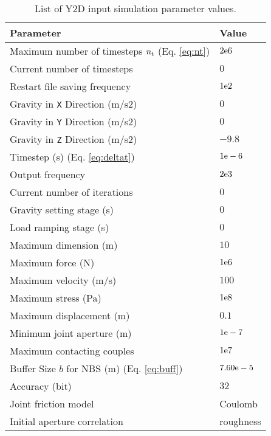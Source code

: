 \documentclass[format=acmtog,12pt,screen=true,review=false,natbib=false,]{acmart}
\begin{document}
\begin{table}[t]
  \caption{List of Y2D input simulation parameter values.}
  \begin{tabularx}{\columnwidth}{ll}
    Parameter                               & Value                     \\\midrule
    Maximum number of timesteps $n_{\rm{t}}$ (Eq. \ref{eq:nt})& $2{\rm{e}}6$         \\
    Current number of timesteps             & $0$                       \\
    Restart file saving frequency           & $1{\rm{e}}2$              \\
    Gravity in \texttt{X} Direction (m/s2)  & $0$                       \\
    Gravity in \texttt{Y} Direction (m/s2)  & $0$                       \\
    Gravity in \texttt{Z} Direction (m/s2)  & $-9.8$                    \\
    Timestep (s) (Eq. \ref{eq:deltat})      & $1{\rm{e}}-6$             \\
    Output frequency                        & $2{\rm{e}}3$              \\
    Current number of iterations            & $0$                       \\
    Gravity setting stage (s)               & $0$                       \\
    Load ramping stage (s)                  & $0$                       \\
    Maximum dimension (m)                   & $10$                      \\
    Maximum force (N)                       & $1{\rm{e}}6$              \\
    Maximum velocity (m/s)                  & $100$                     \\
    Maximum stress (Pa)                     & $1{\rm{e}}8$              \\
    Maximum displacement (m)                & $0.1$                     \\
    Minimum joint aperture (m)              & $1{\rm{e}}-7$             \\
    Maximum contacting couples              & $1{\rm{e}}7$              \\
    Buffer Size $b$ for NBS (m) (Eq. \ref{eq:buff})& $7.60{\rm{e}}-5$       \\
    Accuracy (bit)                          & $32$                      \\
    Joint friction model                    & {\small Coulomb}          \\
    Initial aperture correlation            & {\small roughness}        \\\bottomrule
  \end{tabularx}
  \label{tab:simpar}
\end{table}
\end{document}
